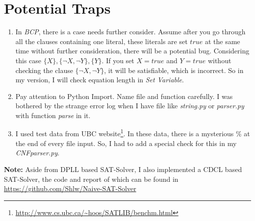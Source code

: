 \documentclass[a4paper,10pt]{article}
\begin{document}
\section{Potential Traps}
\begin{enumerate}
\setlength{\itemsep}{.1em}
\item In \textit{BCP}, there is a case needs further consider. Assume after you go through
    all the clauses containing one literal, these literals are set $true$ at
    the same time without further consideration, there will be a potential bug.
    Considering this case $\{X\},\{\neg X,\neg Y\},\{Y\}$. If you set $X=true$ and $Y=true$
    without checking the clause $\{\neg X,\neg Y\}$, it will be satisfiable, which is
    incorrect. So in my version, I will check equation length in \textit{Set Variable}.
\item Pay attention to Python Import. Name file and function carefully.
    I was bothered by the strange error log
    when I have file like \textit{string.py} or \textit{parser.py}
    with function \textit{parse} in it.
\item I used test data from UBC 
    website\footnote{\url{http://www.cs.ubc.ca/~hoos/SATLIB/benchm.html}}.
    In these data, there is a mysterious \% at the end of every file input.
    So, I had to add a special check for this in my \textit{CNFparser.py}.
\end{enumerate}
\textbf{Note:} Aside from DPLL based SAT-Solver, I also implemented a CDCL based SAT-Solver, the code and report of which can be found in \url{https://github.com/Shlw/Naive-SAT-Solver}
\end{document}
